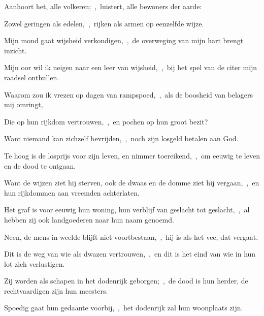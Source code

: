 \documentclass[12pt,twoside,a5paper]{article}
\begin{document}

\begin{halfparskip}
  Aanhoort het, alle volkeren;~\sep\ luistert, alle bewoners der aarde:


  Zowel geringen als edelen,~\sep\ rijken als armen op eenzelfde wijze.

  Mijn mond gaat wijsheid verkondigen,~\sep\ de overweging van mijn hart brengt inzicht.

  Mijn oor wil ik neigen naar een leer van wijsheid,~\sep\ bij het spel van de citer mijn raadsel onthullen.
\end{halfparskip}


\begin{halfparskip}
  Waarom zou ik vrezen op dagen van rampspoed,~\sep\ als de boosheid van belagers mij omringt,

  Die op hun rijkdom vertrouwen,~\sep\ en pochen op hun groot bezit?

  Want niemand kan zichzelf bevrijden,~\sep\ noch zijn losgeld betalen aan God.

  Te hoog is de losprijs voor zijn leven, en nimmer toereikend,~\sep\ om eeuwig te leven en de dood te ontgaan.

  Want de wijzen ziet hij sterven, ook de dwaas en de domme ziet hij vergaan,~\sep\ en hun rijkdommen aan vreemden achterlaten.

  Het graf is voor eeuwig hun woning, hun verblijf van geslacht tot geslacht,~\sep\ al hebben zij ook landgoederen naar hun naam genoemd.

  Neen, de mens in weelde blijft niet voortbestaan,~\sep\ hij is als het vee, dat vergaat.
\end{halfparskip}


\begin{halfparskip}
  Dit is de weg van wie als dwazen vertrouwen,~\sep\ en dit is het eind van wie in hun lot zich verlustigen.

  Zij worden als schapen in het dodenrijk geborgen;~\sep\ de dood is hun herder, de rechtvaardigen zijn hun meesters.

  Spoedig gaat hun gedaante voorbij,~\sep\ het dodenrijk zal hun woonplaats zijn.
\end{halfparskip}
\end{document}
